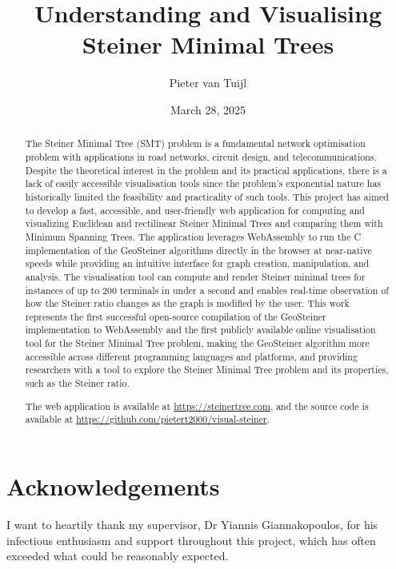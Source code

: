 \documentclass{l4proj}
\begin{document}
\title{Understanding and Visualising Steiner Minimal Trees}
\author{Pieter van Tuijl}
\date{March 28, 2025}

\maketitle

\begin{abstract}
    The Steiner Minimal Tree (SMT) problem is a fundamental network optimisation problem with applications in road networks, circuit design, and telecommunications. Despite the theoretical interest in the problem and its practical applications, there is a lack of easily accessible visualisation tools since the problem's exponential nature has historically limited the feasibility and practicality of such tools. This project has aimed to develop a fast, accessible, and user-friendly web application for computing and visualizing Euclidean and rectilinear Steiner Minimal Trees and comparing them with Minimum Spanning Trees. The application leverages WebAssembly to run the C implementation of the GeoSteiner algorithms directly in the browser at near-native speeds while providing an intuitive interface for graph creation, manipulation, and analysis. The visualisation tool can compute and render Steiner minimal trees for instances of up to 200 terminals in under a second and enables real-time observation of how the Steiner ratio changes as the graph is modified by the user. This work represents the first successful open-source compilation of the GeoSteiner implementation to WebAssembly and the first publicly available online visualisation tool for the Steiner Minimal Tree problem, making the GeoSteiner algorithm more accessible across different programming languages and platforms, and providing researchers with a tool to explore the Steiner Minimal Tree problem and its properties, such as the Steiner ratio.

    The web application is available at \url{https://steinertree.com}, and the source code is available at \url{https://github.com/pietert2000/visual-steiner}.
\end{abstract}

\chapter*{Acknowledgements}
I want to heartily thank my supervisor, Dr Yiannis Giannakopoulos, for his infectious enthusiasm and support throughout this project, which has often exceeded what could be reasonably expected.
\end{document}
